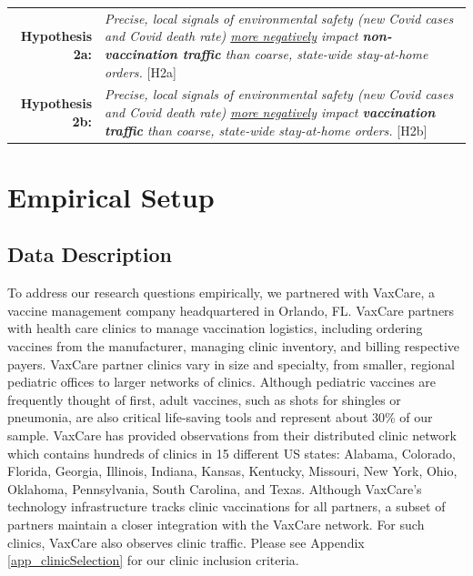  \medskip \noindent
 \begin{tabularx}{\linewidth}{ r X }
    \textbf{Hypothesis 2a:} & \textit{Precise, local signals of environmental safety (new Covid cases and Covid death rate) \underline{more negatively} impact \textbf{non-vaccination traffic} than coarse, state-wide stay-at-home orders.} [H2a]  \\
    \textbf{Hypothesis 2b:} & \textit{Precise, local signals of environmental safety (new Covid cases and Covid death rate) \underline{more negatively} impact \textbf{vaccination traffic} than coarse, state-wide stay-at-home orders.} [H2b] 
 \end{tabularx}   %
 
 
\section{Empirical Setup} \label{Empirical}
\subsection{Data Description} \label{data}
 To address our research questions empirically, we partnered with VaxCare, a vaccine management company headquartered in Orlando, FL. VaxCare partners with health care clinics to manage vaccination logistics, including ordering vaccines from the manufacturer, managing clinic inventory, and billing respective payers. VaxCare partner clinics vary in size and specialty, from smaller, regional pediatric offices to larger networks of clinics. Although pediatric vaccines are frequently thought of first, adult vaccines, such as shots for shingles or pneumonia, are also critical life-saving tools and represent about 30\% of our sample. VaxCare has provided observations from their distributed clinic network which contains hundreds of clinics in 15 different US states: Alabama, Colorado, Florida, Georgia, Illinois, Indiana, Kansas, Kentucky, Missouri, New York, Ohio, Oklahoma, Pennsylvania, South Carolina, and Texas. Although VaxCare’s technology infrastructure tracks clinic vaccinations for all partners, a subset of partners maintain a closer integration with the VaxCare network. For such clinics, VaxCare also observes clinic traffic. Please see Appendix \ref{app_clinicSelection} for our clinic inclusion criteria.
 
